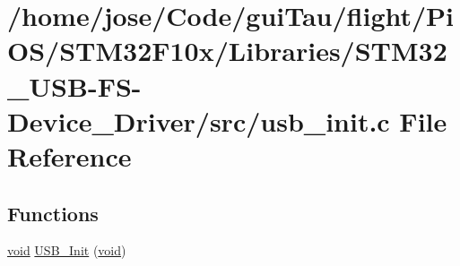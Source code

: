 \hypertarget{_s_t_m32_f10x_2_libraries_2_s_t_m32___u_s_b-_f_s-_device___driver_2src_2usb__init_8c}{\section{/home/jose/\-Code/gui\-Tau/flight/\-Pi\-O\-S/\-S\-T\-M32\-F10x/\-Libraries/\-S\-T\-M32\-\_\-\-U\-S\-B-\/\-F\-S-\/\-Device\-\_\-\-Driver/src/usb\-\_\-init.c File Reference}
\label{_s_t_m32_f10x_2_libraries_2_s_t_m32___u_s_b-_f_s-_device___driver_2src_2usb__init_8c}
}
\subsection*{Functions}
\begin{DoxyCompactItemize}
\item 
\hyperlink{group___n_a_m_e_ga18028b8badbf1ea7e704ccac3c488e82}{void} \hyperlink{_s_t_m32_f10x_2_libraries_2_s_t_m32___u_s_b-_f_s-_device___driver_2src_2usb__init_8c_a35fe971cbcbfe8813199e869284cb862}{U\-S\-B\-\_\-\-Init} (\hyperlink{group___n_a_m_e_ga18028b8badbf1ea7e704ccac3c488e82}{void})
\end{DoxyCompactItemize}
